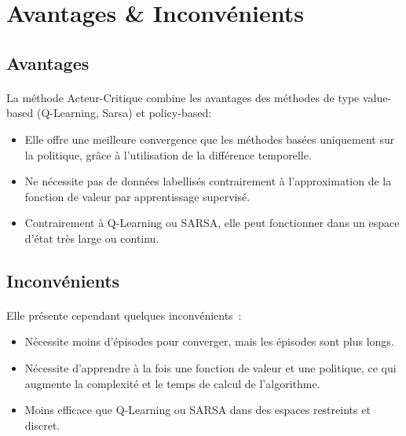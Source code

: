 \section{Avantages \& Inconvénients}

\subsection{Avantages}

\paragraph{}
\begin{samepage}
La méthode Acteur-Critique combine les avantages des méthodes de type value-based (Q-Learning, Sarsa) et policy-based:
\end{samepage}
\begin{itemize}
  \item Elle offre une meilleure convergence que les méthodes basées uniquement sur la politique, grâce à l'utilisation de la différence temporelle.
  \item Ne nécessite pas de données labellisés contrairement à l'approximation de la fonction de valeur par apprentissage supervisé.
  \item Contrairement à Q-Learning ou SARSA, elle peut fonctionner dans un espace d'état très large ou continu.
\end{itemize}
\subsection{Inconvénients}
\paragraph{}
Elle présente cependant quelques inconvénients~:
\begin{itemize}
  \item Nécessite moins d'épisodes pour converger, mais les épisodes sont plus longs.
  \item Nécessite d'apprendre à la fois une fonction de valeur et une politique, ce qui augmente la complexité et le temps de calcul de l'algorithme.
  \item Moins efficace que Q-Learning ou SARSA dans des espaces restreints et discret.
\end{itemize}

